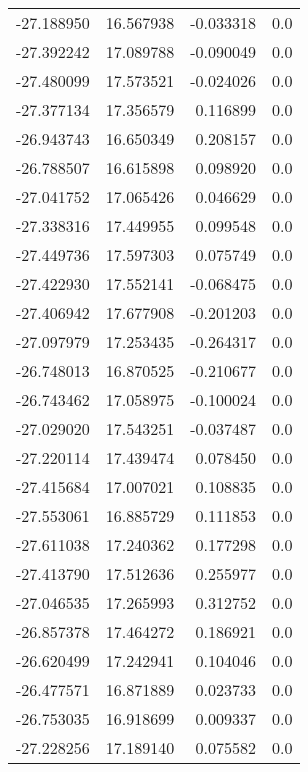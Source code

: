 \begin{tabular}{rrrr}
      -27.188950 &        16.567938 &   -0.033318 &   0.0 \\
      -27.392242 &        17.089788 &   -0.090049 &   0.0 \\
      -27.480099 &        17.573521 &   -0.024026 &   0.0 \\
      -27.377134 &        17.356579 &    0.116899 &   0.0 \\
      -26.943743 &        16.650349 &    0.208157 &   0.0 \\
      -26.788507 &        16.615898 &    0.098920 &   0.0 \\
      -27.041752 &        17.065426 &    0.046629 &   0.0 \\
      -27.338316 &        17.449955 &    0.099548 &   0.0 \\
      -27.449736 &        17.597303 &    0.075749 &   0.0 \\
      -27.422930 &        17.552141 &   -0.068475 &   0.0 \\
      -27.406942 &        17.677908 &   -0.201203 &   0.0 \\
      -27.097979 &        17.253435 &   -0.264317 &   0.0 \\
      -26.748013 &        16.870525 &   -0.210677 &   0.0 \\
      -26.743462 &        17.058975 &   -0.100024 &   0.0 \\
      -27.029020 &        17.543251 &   -0.037487 &   0.0 \\
      -27.220114 &        17.439474 &    0.078450 &   0.0 \\
      -27.415684 &        17.007021 &    0.108835 &   0.0 \\
      -27.553061 &        16.885729 &    0.111853 &   0.0 \\
      -27.611038 &        17.240362 &    0.177298 &   0.0 \\
      -27.413790 &        17.512636 &    0.255977 &   0.0 \\
      -27.046535 &        17.265993 &    0.312752 &   0.0 \\
      -26.857378 &        17.464272 &    0.186921 &   0.0 \\
      -26.620499 &        17.242941 &    0.104046 &   0.0 \\
      -26.477571 &        16.871889 &    0.023733 &   0.0 \\
      -26.753035 &        16.918699 &    0.009337 &   0.0 \\
      -27.228256 &        17.189140 &    0.075582 &   0.0 \\

\end{tabular}
